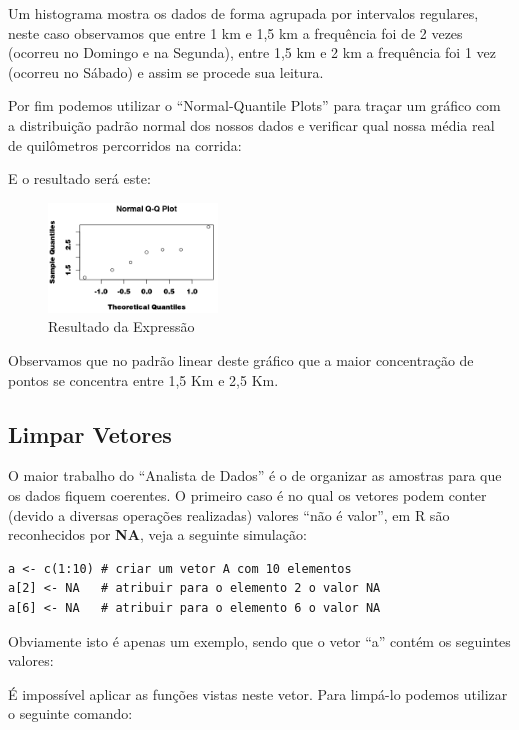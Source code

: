 \documentclass[a4paper,11pt]{article}
\begin{document}
Um histograma mostra os dados de forma agrupada por intervalos regulares, neste caso observamos que entre 1 km e 1,5 km a frequência foi de 2 vezes (ocorreu no Domingo e na Segunda), entre 1,5 km e 2 km a frequência foi 1 vez (ocorreu no Sábado) e assim se procede sua leitura.

Por fim podemos utilizar o ``Normal-Quantile Plots'' para traçar um gráfico com a distribuição padrão normal dos nossos dados e verificar qual nossa média real de quilômetros percorridos na corrida:

E o resultado será este:
\begin{figure}[H]
	\centering
	\includegraphics[width=0.4\textwidth]{imagens/grafico04.png}
	\caption{Resultado da Expressão}
\end{figure}

Observamos que no padrão linear deste gráfico que a maior concentração de pontos se concentra entre 1,5 Km e 2,5 Km.

\subsection{Limpar Vetores}
O maior trabalho do ``Analista de Dados'' é o de organizar as amostras para que os dados fiquem coerentes. O primeiro caso é no qual os vetores podem conter (devido a diversas operações realizadas) valores ``não é valor'', em R são reconhecidos por \textbf{NA}, veja a seguinte simulação:
\begin{lstlisting}
a <- c(1:10) # criar um vetor A com 10 elementos
a[2] <- NA   # atribuir para o elemento 2 o valor NA
a[6] <- NA   # atribuir para o elemento 6 o valor NA
\end{lstlisting}

Obviamente isto é apenas um exemplo, sendo que o vetor ``a'' contém os seguintes valores: \\

É impossível aplicar as funções vistas neste vetor. Para limpá-lo podemos utilizar o seguinte comando: \\
\end{document}
